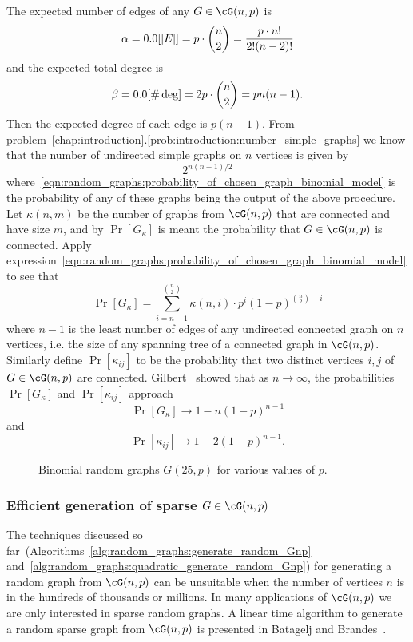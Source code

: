 The expected number of edges of any $G \in \cG(n,p)$ is
\[
\alpha
=
\E[|E|]
=
p \cdot \binom{n}{2}
=
\frac{p \cdot n!} {2! (n - 2)!}
\]
and the expected total degree is
\[
\beta
=
\E[\#\deg]
=
2p \cdot \binom{n}{2}
=
pn(n - 1).
\]
Then the expected degree of each edge is $p(n - 1)$. From
problem~\ref{chap:introduction}.\ref{prob:introduction:number_simple_graphs}
we know that the number of undirected simple graphs on $n$ vertices is
given by
\[
2^{n(n-1) / 2}
\]
where~\eqref{eqn:random_graphs:probability_of_chosen_graph_binomial_model}
is the probability of any of these graphs being the output of the
above procedure. Let $\kappa(n,m)$ be the number of graphs from
$\cG(n,p)$ that are connected and have size $m$, and by $\Pr[G_\kappa]$
is meant the probability that $G \in \cG(n,p)$ is connected. Apply
expression~\eqref{eqn:random_graphs:probability_of_chosen_graph_binomial_model}
to see that
\[
\Pr[G_\kappa]
=
\sum_{i=n-1}^{\binom{n}{2}}
\kappa(n,i) \cdot p^i (1 - p)^{\binom{n}{2} - i}
\]
where $n - 1$ is the least number of edges of any undirected connected
graph on $n$ vertices, i.e. the size of any spanning tree of a
connected graph in $\cG(n,p)$. Similarly define $\Pr[\kappa_{ij}]$ to
be the probability that two distinct vertices $i,j$ of
$G \in \cG(n,p)$ are connected. Gilbert~\cite{Gilbert1959} showed that
as $n \to \infty$, the probabilities $\Pr[G_\kappa]$ and
$\Pr[\kappa_{ij}]$ approach
\[
\Pr[G_\kappa] \to 1 - n(1 - p)^{n-1}
\]
and
\[
\Pr[\kappa_{ij}] \to 1 - 2(1 - p)^{n-1}.
\]

\begin{figure}[!htbp]
\centering
{}

\caption{Binomial random graphs $G(25,p)$ for various values of $p$.}
\label{fig:random_graphs:binomial_random_graph_25_nodes}
\end{figure}



\subsubsection{Efficient generation of sparse $G \in \cG(n,p)$}

The techniques discussed so
far~(Algorithms~\ref{alg:random_graphs:generate_random_Gnp}
and~\ref{alg:random_graphs:quadratic_generate_random_Gnp}) for
generating a random graph from $\cG(n,p)$ can be unsuitable when the
number of vertices $n$ is in the hundreds of thousands or millions. In
many applications of $\cG(n,p)$ we are only interested in
sparse random graphs. A linear time algorithm to
generate a random sparse graph from $\cG(n,p)$ is presented in
Batagelj and
Brandes~\cite{BatageljBrandes2005}.

